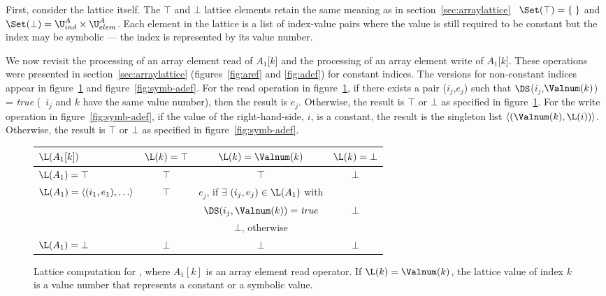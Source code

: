 First, consider the lattice itself. 
The 
$\top$ and $\bot$ lattice elements retain
the same meaning as in section~\ref{sec:arraylattice}
\viz\ $\Set(\top) = \{\;\}$ and 
$\Set(\bot) =  \U^A_{ind} \times \U^A_{elem}$.
Each element in the lattice is a list
of index-value pairs where the value is still required to
be constant but the index may be symbolic --- the index is
represented by its value number.

We now revisit the processing of an array element read of $A_1$[$k$] and
the processing of an array element write of $A_1$[$k$]. These
operations were presented in section~\ref{sec:arraylattice}
(figures~\ref{fig:aref} and \ref{fig:adef})
for constant indices. The versions for
non-constant indices appear in figure~\ref{fig:symb-aref} and
figure~\ref{fig:symb-adef}.
For the read operation in figure~\ref{fig:symb-aref}, if there exists a pair ($i_j$,$e_j$) such that
$\DS$($i_j$,$\Valnum(k)$) = {\it true} (\ie\ $i_j$ and $k$ have the
same value number), then the
result is $e_j$.  Otherwise, the result is $\top$ or $\bot$ as specified
in figure~\ref{fig:symb-aref}.
For the write operation in figure~\ref{fig:symb-adef}, if the value of the right-hand-side, $i$, is a constant, the result is the singleton list
$\langle(\Valnum(k),\L(i))\rangle$.  Otherwise, the result is $\top$ or $\bot$ as specified
in figure~\ref{fig:symb-adef}.

\begin{figure}%
\begin{center}
\begin{tabular}{|l||c|c|c|}
\hline
$\L(A_1[k])$ & $\L(k) = \top$ & $\L(k) = \Valnum(k)$ & $\L(k) = \bot$ \\
\hline \hline
$\L(A_1) = \top$ & $\top$ & $\top$ & $\bot$ \\
\hline
$\L(A_1) = \langle (i_1,e_1), \ldots \rangle$ & $\top$ & $e_j$, 
if $\exists$
$(i_j,e_j) \in \L(A_1)$ with &\\
& & $\DS(i_j, \Valnum(k)) = \mbox{\it true}$ & $\bot$\\
& & $\bot$, otherwise & \\
\hline
$\L(A_1) = \bot$ & $\bot$ & $\bot$ & $\bot$ \\
\hline
\end{tabular}
\end{center}
\caption{Lattice computation for ,
where $A_1[k]$ is an 
array element read operator. If $\L(k)=\Valnum(k)$, the lattice value of index $k$ is a value number that represents a constant or a symbolic value.}
\label{fig:symb-aref}
\end{figure}

